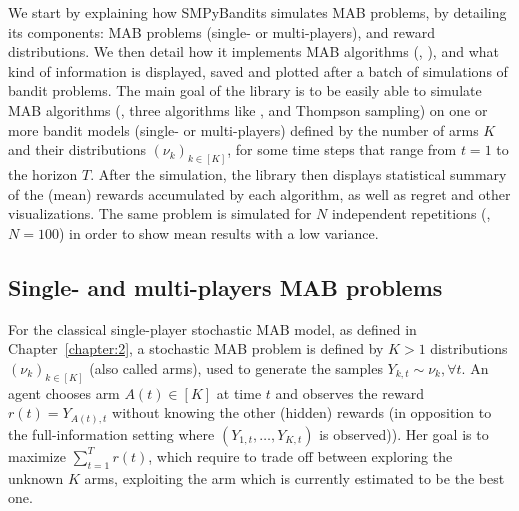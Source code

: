 We start by explaining how SMPyBandits simulates MAB problems, by detailing its components:
MAB problems (single- or multi-players),
and reward distributions.
%
We then detail how it implements MAB algorithms (\eg, \UCB),
and what kind of information is displayed, saved and plotted after a batch of simulations of bandit problems.
%
%
The main goal of the library is to be easily able to simulate MAB algorithms (\eg, three algorithms like \UCB, \klUCB{} and Thompson sampling) on one or more bandit models (single- or multi-players) defined by the number of arms $K$ and their distributions $(\nu_k)_{k\in[K]}$, for some time steps that range from $t=1$ to the horizon $T$.
After the simulation, the library then displays statistical summary of the (mean) rewards accumulated by each algorithm, as well as regret and other visualizations.
The same problem is simulated for $N$ independent repetitions (\eg, $N=100$) in order to show mean results with a low variance.


\subsection{Single- and multi-players MAB problems}

For the classical single-player stochastic MAB model, as defined in Chapter~\ref{chapter:2},
a stochastic MAB problem is defined by $K>1$ distributions $(\nu_k)_{k\in[K]}$ (also called arms),
used to generate the \iid{} samples $Y_{k,t} \sim \nu_k, \forall t$.
%
An agent chooses arm $A(t)\in[K]$ at time $t$ and observes the reward $r(t) = Y_{A(t),t}$ without knowing the other (hidden) rewards (in opposition to the full-information setting where $(Y_{1,t},\dots,Y_{K,t})$ is observed)).
%
Her goal is to maximize $\sum_{t=1}^T r(t)$, which require to trade off between exploring the unknown $K$ arms, exploiting the arm which is currently estimated to be the best one.

